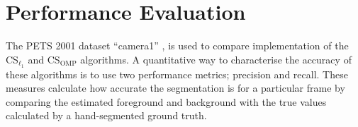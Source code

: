 \documentclass[conference]{IEEEtran}
\begin{document}
%




\section{Performance Evaluation}\label{sec:results}

The PETS 2001 dataset ``camera1''  \cite{pets2001},  is used to compare implementation of the CS$_{\ell_1}$ and CS$_{\text{OMP}}$ algorithms. A quantitative way to characterise the accuracy of these algorithms is to use two performance metrics; precision and recall.  These measures calculate how accurate the segmentation is for a particular frame by comparing the estimated foreground and background with the true values calculated by a hand-segmented ground truth.
\end{document}

